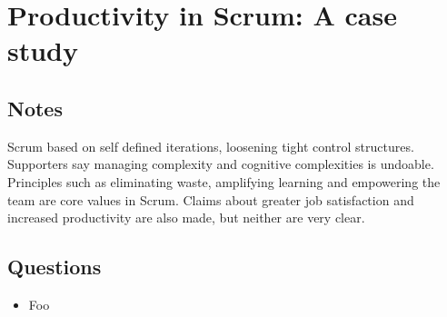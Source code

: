 \chapter{Productivity in Scrum: A case study \cite{dongen2011productivity}}
\section{Notes}
Scrum based on self defined iterations, loosening tight control structures. 
Supporters say managing complexity and cognitive complexities is undoable.
Principles such as eliminating waste, amplifying learning and empowering the team are core values in Scrum.
Claims about greater job satisfaction and increased productivity are also made, but neither are very clear.


\section{Questions}
\begin{itemize}
  \item Foo
\end{itemize}
